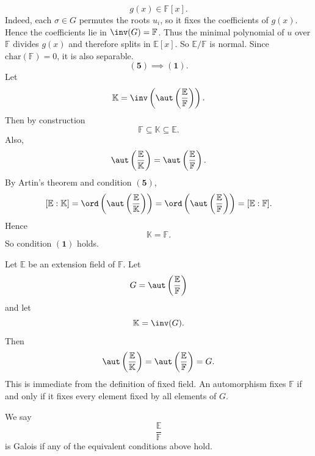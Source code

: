 \begin{theorem}
    \[
        g(x)\in \mathbb{F}[x].
    \]
    Indeed, each $\sigma\in G$ permutes the roots $u_i$, so it fixes the coefficients of $g(x)$.
    Hence the coefficients lie in $\inv(G)=\mathbb{F}$.
    Thus the minimal polynomial of $u$ over $\mathbb{F}$ divides $g(x)$ and therefore splits in $\mathbb{E}[x]$.
    So $\mathbb{E}/\mathbb{F}$ is normal.
    Since $\mathrm{char}(\mathbb{F})=0$, it is also separable.
    \[
        \mathbf{(5)}\implies \mathbf{(1)}.
    \]
    Let
    \[
        \mathbb{K}=\inv\left(\aut\left(\frac{\mathbb{E}}{\mathbb{F}}\right)\right).
    \]
    Then by construction
    \[
        \mathbb{F}\subseteq \mathbb{K}\subseteq \mathbb{E}.
    \]
    Also,
    \[
        \aut\left(\frac{\mathbb{E}}{\mathbb{K}}\right)
        =
        \aut\left(\frac{\mathbb{E}}{\mathbb{F}}\right).
    \]
    By Artin's theorem and condition \(\mathbf{(5)}\),
    \[
        [\mathbb{E}:\mathbb{K}]
        =
        \ord\left(\aut\left(\frac{\mathbb{E}}{\mathbb{K}}\right)\right)
        =
        \ord\left(\aut\left(\frac{\mathbb{E}}{\mathbb{F}}\right)\right)
        =
        [\mathbb{E}:\mathbb{F}].
    \]
    Hence
    \[
        \mathbb{K}=\mathbb{F}.
    \]
    So condition \(\mathbf{(1)}\) holds.
\end{theorem}

\begin{lemma}{
    Let $\mathbb{E}$ be an extension field of $\mathbb{F}$.
    Let
    \[
        G=\aut\left(\frac{\mathbb{E}}{\mathbb{F}}\right)
    \]
    and let
    \[
        \mathbb{K}=\inv(G).
    \]
    Then
    \[
        \aut\left(\frac{\mathbb{E}}{\mathbb{K}}\right)
        =
        \aut\left(\frac{\mathbb{E}}{\mathbb{F}}\right)
        =
        G.
    \]
}
    This is immediate from the definition of fixed field.
    An automorphism fixes $\mathbb{F}$ if and only if it fixes every element fixed by all elements of $G$.
\end{lemma}

\begin{definition}[Galois]
    We say
    \[
        \frac{\mathbb{E}}{\mathbb{F}}
    \]
    is Galois if any of the equivalent conditions above hold.
\end{definition}

